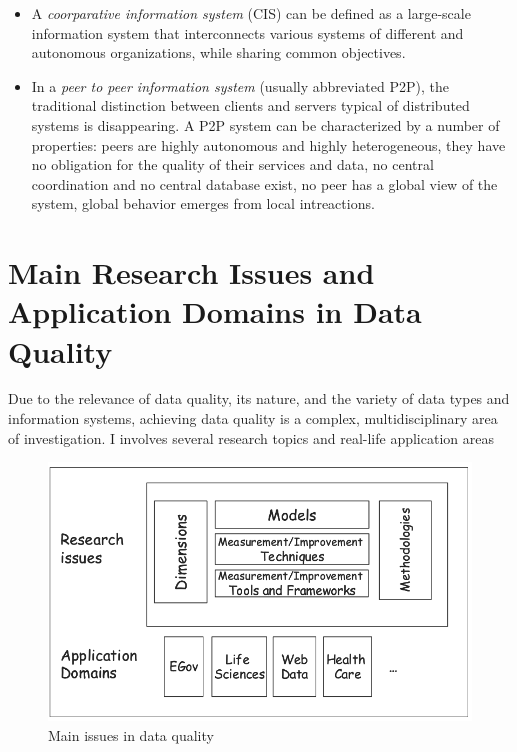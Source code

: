 \begin{itemize}
    \item{A \textit{coorparative information system} (CIS) can be defined as a large-scale information system that interconnects various systems of different and autonomous organizations, 
    while sharing common objectives.}
    \item{In a \textit{peer to peer information system} (usually abbreviated P2P), the traditional distinction between clients and servers typical of distributed systems is disappearing.
    A P2P system can be characterized by a number of properties: peers are highly autonomous and highly heterogeneous, they have no obligation for the quality of their services
    and data, no central coordination and no central database exist, no peer has a global view of the system, global behavior emerges from local intreactions.    
    }
\end{itemize}


\section{Main Research Issues and Application Domains in Data Quality}
Due to the relevance of data quality, its nature, and the variety of data types and information systems, achieving data quality is a complex, multidisciplinary 
area of investigation. I involves several research topics and real-life application areas

\begin{figure}[H]
\centering
\includegraphics[scale=.50]{main-issues-in-dq}
\caption{Main issues in data quality}    
\end{figure}